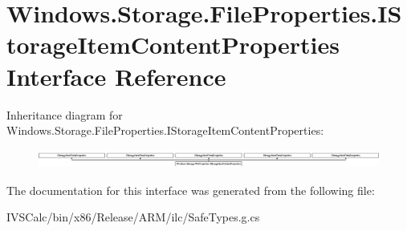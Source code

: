 \hypertarget{interface_windows_1_1_storage_1_1_file_properties_1_1_i_storage_item_content_properties}{}\section{Windows.\+Storage.\+File\+Properties.\+I\+Storage\+Item\+Content\+Properties Interface Reference}
\label{interface_windows_1_1_storage_1_1_file_properties_1_1_i_storage_item_content_properties}
Inheritance diagram for Windows.\+Storage.\+File\+Properties.\+I\+Storage\+Item\+Content\+Properties\+:\begin{figure}[H]
\begin{center}
\leavevmode
\includegraphics[height=0.597333cm]{interface_windows_1_1_storage_1_1_file_properties_1_1_i_storage_item_content_properties}
\end{center}
\end{figure}


The documentation for this interface was generated from the following file\+:\begin{DoxyCompactItemize}
\item 
I\+V\+S\+Calc/bin/x86/\+Release/\+A\+R\+M/ilc/Safe\+Types.\+g.\+cs\end{DoxyCompactItemize}
